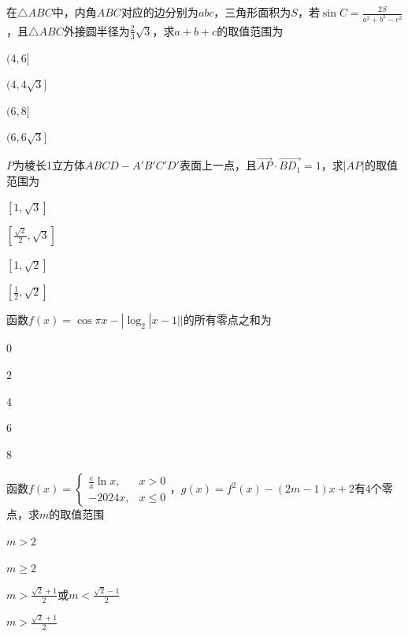\documentclass{exam-zh}
\begin{document}
\begin{question}
  在$\triangle ABC$中，内角$ABC$对应的边分别为$abc$，三角形面积为$S$，若$\sin C=\frac{2S}{a^2+b^2-c^2}$，且$\triangle ABC$外接圆半径为$\frac23\sqrt{3}$，求$a+b+c$的取值范围为 \paren

  \begin{choices}
    \item $(4,6]$
    \item $(4,4\sqrt3]$
    \item $(6,8]$
    \item $(6,6\sqrt 3]$
  \end{choices}
\end{question}

\begin{question}
  $P$为棱长1立方体$ABCD-A'B'C'D'$表面上一点，且$\vec{AP}\cdot\vec{BD_1}=1$，求$|AP|$的取值范围为 \paren

  \begin{choices}
    \item $[1,\sqrt3]$
    \item $[\frac{\sqrt 2}2,\sqrt3]$
    \item $[1, \sqrt2]$
    \item $[\frac12,\sqrt2]$
  \end{choices}
\end{question}

\begin{question}
  函数$f(x)=\cos\pi x-|\log_2|x-1||$的所有零点之和为 \paren

  \begin{choices}
    \item 0
    \item 2
    \item 4
    \item 6
    \item 8
  \end{choices}
\end{question}

\begin{question}
  函数$f(x)=\begin{cases}\frac ex\ln x,&x>0\\-2024x,&x\le0\end{cases}$，$g(x)=f^2(x)-(2m-1)x+2$有4个零点，求$m$的取值范围 \paren

  \begin{choices}
    \item $m>2$
    \item $m\ge2$
    \item $m>\frac{\sqrt2+1}2$或$m<\frac{\sqrt2-1}2$
    \item $m>\frac{\sqrt2+1}2$
  \end{choices}
\end{question}
\end{document}

